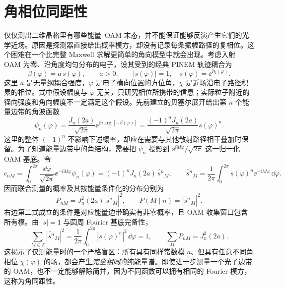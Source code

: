 \section{角相位同距性}
仅仅测出二维晶格里有哪些能量--OAM 末态，并不能保证能够反演产生它们的光学近场。原因是探测器直接给出概率模方，却没有记录每条振幅路径的复相位。这个困难在一个比完整 Maxwell 求解更简单的角向模型中就会出现。考虑入射 OAM 为零、沿角度均匀分布的电子，设其受到的经典 PINEM 轨迹耦合为
\begin{equation}
 \beta(\varphi)=a\,s(\varphi),\qquad a>0,\qquad |s(\varphi)|=1,
 \quad s(\varphi)=\ee^{\ii\chi(\varphi)}.
 \label{eq:oam-phase-only-coupling}
\end{equation}
这里 $a$ 是无量纲耦合强度，$\varphi$ 是电子横向位置的方位角，$\chi$ 是近场沿电子路径积累的相位。式中假设幅度与 $\varphi$ 无关，只研究相位所携带的信息；实际粒子附近的径向强度和角向幅度不一定满足这个假设。先前建立的贝塞尔展开给出第 $n$ 个能量边带的角波函数
\begin{equation}
 \psi_n(\varphi)=\frac{J_n(2a)}{\sqrt{2\pi}}
 \ee^{\ii n\arg[-\beta(\varphi)]}
 =\frac{(-1)^nJ_n(2a)}{\sqrt{2\pi}}s(\varphi)^n.
 \label{eq:oam-phase-only-sideband}
\end{equation}
这里的整体 $(-1)^n$ 不影响下述概率，却应在需要与其他散射路径相干叠加时保留。为了知道能量边带中的角结构，需要把 $\psi_n$ 投影到 $\ee^{\ii M\varphi}/\sqrt{2\pi}$ 这一归一化 OAM 基底。令
\begin{equation}
 c_{nM}=\int_0^{2\pi}\frac{\dd\varphi}{\sqrt{2\pi}}
 \ee^{-\ii M\varphi}\psi_n(\varphi)
 =(-1)^nJ_n(2a)\,\widetilde{s^n}_M,
 \qquad
 \widetilde{s^n}_M=\frac{1}{2\pi}\int_0^{2\pi}
 s(\varphi)^n\ee^{-\ii M\varphi}\,\dd\varphi.
 \label{eq:oam-phase-power-fourier}
\end{equation}
因而联合测量的概率及其按能量条件化的分布分别为
\begin{equation}
 P_{nM}=J_n^2(2a)|\widetilde{s^n}_M|^2,
 \qquad P(M\mid n)=|\widetilde{s^n}_M|^2.
 \label{eq:oam-homometry-joint}
\end{equation}
右边第二式成立的条件是对应能量边带确实有非零概率，且 OAM 收集窗口包含所有模。由 $|s|=1$ 与圆周 Fourier 基底完备性，
\begin{equation*}
 \sum_{M\in\mathbb Z}|\widetilde{s^n}_M|^2
 =\frac{1}{2\pi}\int_0^{2\pi}|s(\varphi)^n|^2\,\dd\varphi=1,
 \qquad
 \sum_M P_{nM}=J_n^2(2a).
\end{equation*}
这揭示了仅测能量时的一个严格盲区：所有具有同样常数模 $a$、但具有任意不同角相位 $\chi(\varphi)$ 的场，都会产生\emph{完全相同}的纯能量谱。即使进一步测量一个光子边带的 OAM，也不一定能够解除简并，因为不同函数可以拥有相同的 Fourier 模方，这称为角同距性。

